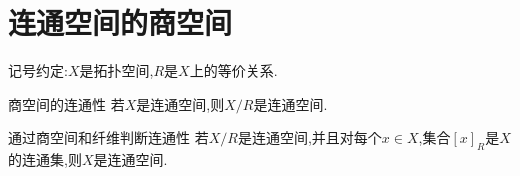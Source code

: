 \section{连通空间的商空间}

记号约定:$X$是拓扑空间,$R$是$X$上的等价关系.

\begin{proposition}{商空间的连通性}{}
	若$X$是连通空间,则$X/R$是连通空间.
\end{proposition}

\begin{proposition}{通过商空间和纤维判断连通性}{}
	若$X/R$是连通空间,并且对每个$x\in X$,集合$\left[x\right]_{R}$是$X$的连通集,则$X$是连通空间.
\end{proposition}